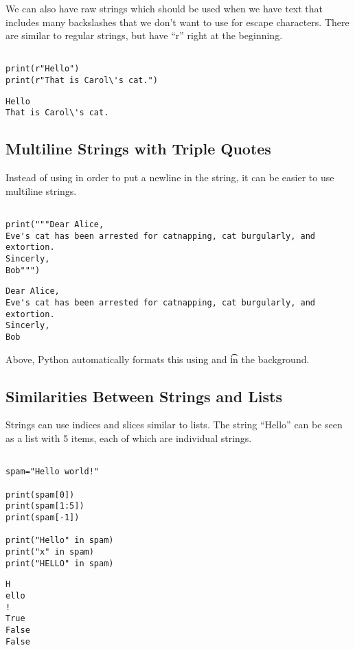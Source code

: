 \documentclass[11pt]{article}
\begin{document}
We can also have raw strings which should be used when we have text that includes many backslashes that we don't want to use for escape characters. There are similar to regular strings, but have ``r'' right at the beginning.

\begin{verbatim}

print(r"Hello")
print(r"That is Carol\'s cat.")

\end{verbatim}

\begin{verbatim}
Hello
That is Carol\'s cat.
\end{verbatim}

\subsection{Multiline Strings with Triple Quotes}
\label{sec:org6bcf3ce}

Instead of using \n in order to put a newline in the string, it can be easier to use multiline strings.

\begin{verbatim}

print("""Dear Alice,
Eve's cat has been arrested for catnapping, cat burgularly, and extortion.
Sincerly,
Bob""")

\end{verbatim}

\begin{verbatim}
Dear Alice,
Eve's cat has been arrested for catnapping, cat burgularly, and extortion.
Sincerly,
Bob
\end{verbatim}


Above, Python automatically formats this using \n and \t in the background.

\subsection{Similarities Between Strings and Lists}
\label{sec:org6ac4f19}

Strings can use indices and slices similar to lists. The string ``Hello'' can be seen as a list with 5 items, each of which are individual strings.

\begin{verbatim}

spam="Hello world!"

print(spam[0])
print(spam[1:5])
print(spam[-1])

print("Hello" in spam)
print("x" in spam)
print("HELLO" in spam)

\end{verbatim}

\begin{verbatim}
H
ello
!
True
False
False
\end{verbatim}
\end{document}
